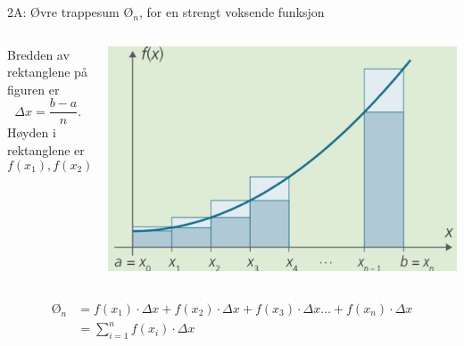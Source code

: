 \greenheader
\begin{frame}{2A: Øvre trappesum $\text{Ø}_n$,  for en strengt voksende funksjon}
    \begin{columns} 
        \begin{column}{0.42\textwidth}
            Bredden av rektanglene på figuren er 
            \[
                \Delta x = \frac{b-a}{n}.
            \]
            Høyden i rektanglene er 
            \[
                f(x_1), f(x_2), f(x_3), \dots, f(x_{n}).
            \]
           
            
        \end{column}
        \begin{column}{0.58\textwidth}
            \centering
            \includegraphics[width=1\linewidth]{R2-K2A-15.png}
        \end{column}
    \end{columns}
    \begin{align*}
                 \text{Ø}_n &=  
                 f(x_1)\cdot \Delta x + f(x_2)\cdot \Delta x + f(x_3)\cdot \Delta x \dots + f(x_{n})\cdot \Delta x\\
                &=  \sum_{i=1}^{n} f(x_{i})\cdot \Delta x
            \end{align*}
\end{frame}

